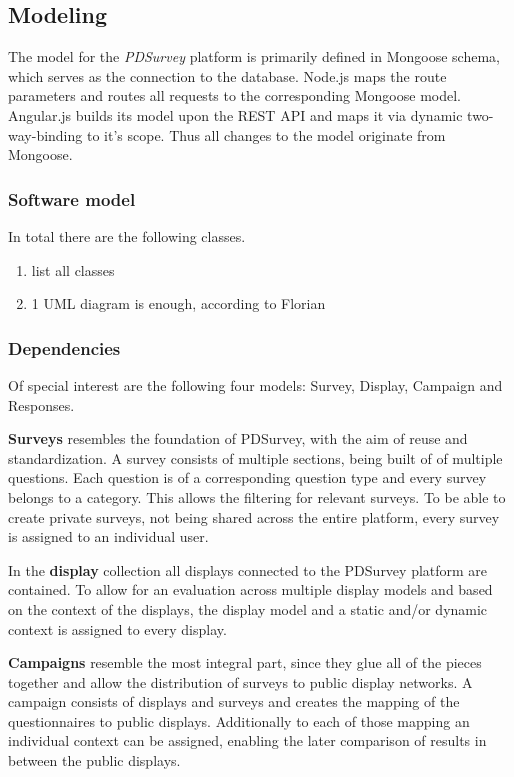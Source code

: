 \subsection{Modeling}
\label{4c_modeling}

The model for the \textit{PDSurvey} platform is primarily defined in Mongoose schema, which serves as the connection to the database. Node.js maps the route parameters and routes all requests to the corresponding Mongoose model. Angular.js builds its model upon the REST API and maps it via dynamic two-way-binding to it's scope. Thus all changes to the model originate from Mongoose.


\subsubsection{Software model}

In total there are the following classes.

\begin{enumerate}
\item list all classes
\item 1 UML diagram is enough, according to Florian
\end{enumerate}


\subsubsection{Dependencies}

Of special interest are the following four models: Survey, Display, Campaign and Responses.

\textbf{Surveys} resembles the foundation of PDSurvey, with the aim of reuse and standardization. A survey consists of multiple sections, being built of of multiple questions. Each question is of a corresponding question type and every survey belongs to a category. This allows the filtering for relevant surveys. To be able to create private surveys, not being shared across the entire platform, every survey is assigned to an individual user.

In the \textbf{display} collection all displays connected to the PDSurvey platform are contained. To allow for an evaluation across multiple display models and based on the context of the displays, the display model and a static and/or dynamic context is assigned to every display.

\textbf{Campaigns} resemble the most integral part, since they glue all of the pieces together and allow the distribution of surveys to public display networks. A campaign consists of displays and surveys and creates the mapping of the questionnaires to public displays. Additionally to each of those mapping an individual context can be assigned, enabling the later comparison of results in between the public displays.

